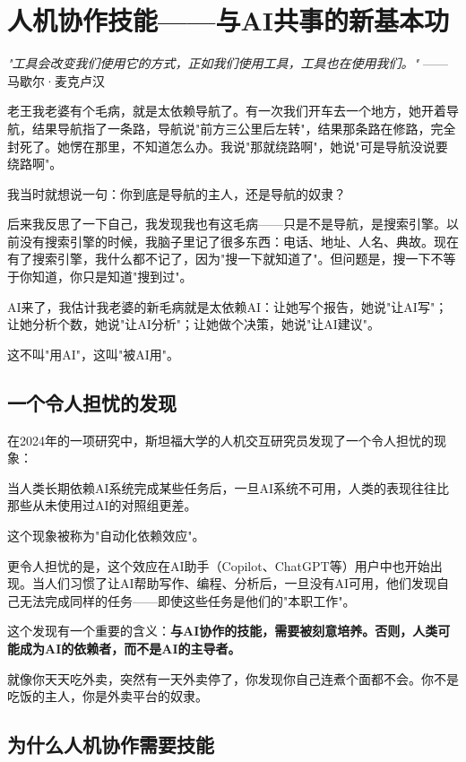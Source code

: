 \chapter{人机协作技能——与AI共事的新基本功}


\textit{"工具会改变我们使用它的方式，正如我们使用工具，工具也在使用我们。"}
——马歇尔·麦克卢汉


老王我老婆有个毛病，就是太依赖导航了。有一次我们开车去一个地方，她开着导航，结果导航指了一条路，导航说"前方三公里后左转"，结果那条路在修路，完全封死了。她愣在那里，不知道怎么办。我说"那就绕路啊"，她说"可是导航没说要绕路啊"。

我当时就想说一句：你到底是导航的主人，还是导航的奴隶？

后来我反思了一下自己，我发现我也有这毛病——只是不是导航，是搜索引擎。以前没有搜索引擎的时候，我脑子里记了很多东西：电话、地址、人名、典故。现在有了搜索引擎，我什么都不记了，因为"搜一下就知道了"。但问题是，搜一下不等于你知道，你只是知道"搜到过"。

AI来了，我估计我老婆的新毛病就是太依赖AI：让她写个报告，她说"让AI写"；让她分析个数，她说"让AI分析"；让她做个决策，她说"让AI建议"。

这不叫"用AI"，这叫"被AI用"。

\section{一个令人担忧的发现}


在2024年的一项研究中，斯坦福大学的人机交互研究员发现了一个令人担忧的现象：

当人类长期依赖AI系统完成某些任务后，一旦AI系统不可用，人类的表现往往比那些从未使用过AI的对照组更差。

这个现象被称为"自动化依赖效应"。

更令人担忧的是，这个效应在AI助手（Copilot、ChatGPT等）用户中也开始出现。当人们习惯了让AI帮助写作、编程、分析后，一旦没有AI可用，他们发现自己无法完成同样的任务——即使这些任务是他们的"本职工作"。

这个发现有一个重要的含义：\textbf{与AI协作的技能，需要被刻意培养。否则，人类可能成为AI的依赖者，而不是AI的主导者。}

就像你天天吃外卖，突然有一天外卖停了，你发现你自己连煮个面都不会。你不是吃饭的主人，你是外卖平台的奴隶。

\section{为什么人机协作需要技能}


